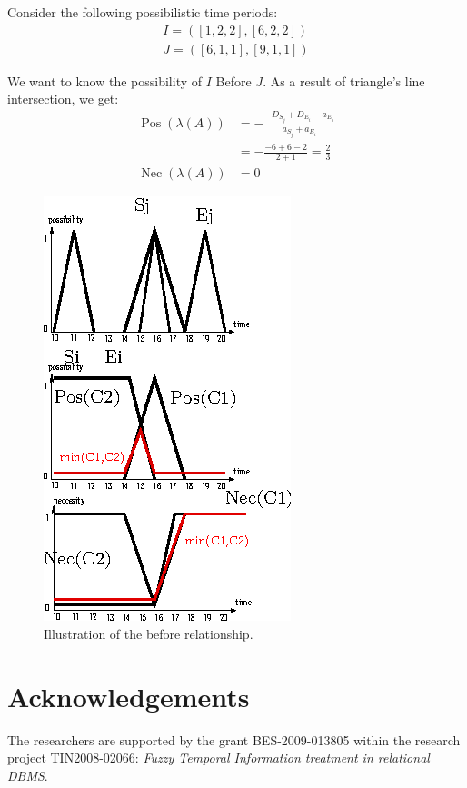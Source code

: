 \documentclass{llncs}
\newcommand{\Pos}{\operatorname{Pos}}
\newcommand{\Nec}{\operatorname{Nec}}
\begin{document}
\begin{example}
Consider the following possibilistic time periods:
\begin{align}
I = \left( \left[1,2,2 \right] , \left[6,2,2 \right] \right)\\
\nonumber
J = \left( \left[6,1,1 \right] , \left[9,1,1 \right] \right)
\end{align}

We want to know the possibility of $I$ Before $J$. As a result of triangle's line intersection, we get:
\begin{align}
 \label{sample:before}
\Pos \left(\lambda \left(A \right)\right) &= - \frac{-D_{S_j} + D_{E_i}-a_{E_i}}{a_{S_j}+a_{E_i}}\\
\nonumber
&= - \frac{-6+6-2}{2+1} = \frac{2}{3}\\
\Nec \left(\lambda \left(A\right)\right) &= 0
\end{align}


\begin{figure}[ht]
\caption{Illustration of the before relationship.}
\includegraphics[scale=2.1]{./graphs/before.eps} 
\end{figure}



\end{example}







\newpage

\section*{Acknowledgements}
%
The researchers are supported by the grant BES-2009-013805 within the research project TIN2008-02066: \emph{Fuzzy Temporal Information treatment in relational DBMS}.



\end{document}
